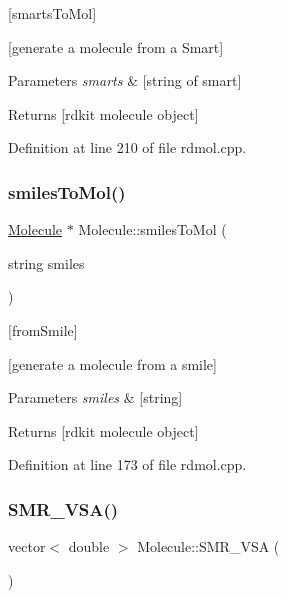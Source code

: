 \mbox{[}smarts\+To\+Mol\mbox{]} 

\mbox{[}generate a molecule from a Smart\mbox{]}


\begin{DoxyParams}{Parameters}
{\em smarts} & \mbox{[}string of smart\mbox{]} \\
\hline
\end{DoxyParams}
\begin{DoxyReturn}{Returns}
\mbox{[}rdkit molecule object\mbox{]} 
\end{DoxyReturn}


Definition at line 210 of file rdmol.\+cpp.

\mbox{\label{class_molecule_a8aa7308d675a16f2513de6c343eb11d3}} 
\subsubsection{\texorpdfstring{smiles\+To\+Mol()}{smilesToMol()}}
{\footnotesize\ttfamily \mbox{\hyperlink{class_molecule}{Molecule}} $\ast$ Molecule\+::smiles\+To\+Mol (\begin{DoxyParamCaption}\item[{string}]{smiles }\end{DoxyParamCaption})\hspace{0.3cm}{\ttfamily [static]}}



\mbox{[}from\+Smile\mbox{]} 

\mbox{[}generate a molecule from a smile\mbox{]}


\begin{DoxyParams}{Parameters}
{\em smiles} & \mbox{[}string\mbox{]} \\
\hline
\end{DoxyParams}
\begin{DoxyReturn}{Returns}
\mbox{[}rdkit molecule object\mbox{]} 
\end{DoxyReturn}


Definition at line 173 of file rdmol.\+cpp.

\mbox{\label{class_molecule_a839c9f1848b3b0c953ca7f4902e86086}} 
\subsubsection{\texorpdfstring{S\+M\+R\+\_\+\+V\+S\+A()}{SMR\_VSA()}}
{\footnotesize\ttfamily vector$<$ double $>$ Molecule\+::\+S\+M\+R\+\_\+\+V\+SA (\begin{DoxyParamCaption}{ }\end{DoxyParamCaption})}



